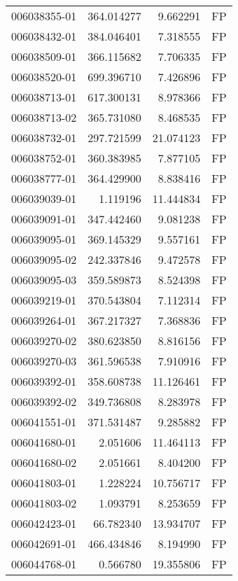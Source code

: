 \begin{tabular}{lrrl}
006038355-01 &  364.014277 &       9.662291 &   FP \\
006038432-01 &  384.046401 &       7.318555 &   FP \\
006038509-01 &  366.115682 &       7.706335 &   FP \\
006038520-01 &  699.396710 &       7.426896 &   FP \\
006038713-01 &  617.300131 &       8.978366 &   FP \\
006038713-02 &  365.731080 &       8.468535 &   FP \\
006038732-01 &  297.721599 &      21.074123 &   FP \\
006038752-01 &  360.383985 &       7.877105 &   FP \\
006038777-01 &  364.429900 &       8.838416 &   FP \\
006039039-01 &    1.119196 &      11.444834 &   FP \\
006039091-01 &  347.442460 &       9.081238 &   FP \\
006039095-01 &  369.145329 &       9.557161 &   FP \\
006039095-02 &  242.337846 &       9.472578 &   FP \\
006039095-03 &  359.589873 &       8.524398 &   FP \\
006039219-01 &  370.543804 &       7.112314 &   FP \\
006039264-01 &  367.217327 &       7.368836 &   FP \\
006039270-02 &  380.623850 &       8.816156 &   FP \\
006039270-03 &  361.596538 &       7.910916 &   FP \\
006039392-01 &  358.608738 &      11.126461 &   FP \\
006039392-02 &  349.736808 &       8.283978 &   FP \\
006041551-01 &  371.531487 &       9.285882 &   FP \\
006041680-01 &    2.051606 &      11.464113 &   FP \\
006041680-02 &    2.051661 &       8.404200 &   FP \\
006041803-01 &    1.228224 &      10.756717 &   FP \\
006041803-02 &    1.093791 &       8.253659 &   FP \\
006042423-01 &   66.782340 &      13.934707 &   FP \\
006042691-01 &  466.434846 &       8.194990 &   FP \\
006044768-01 &    0.566780 &      19.355806 &   FP \\

\end{tabular}

